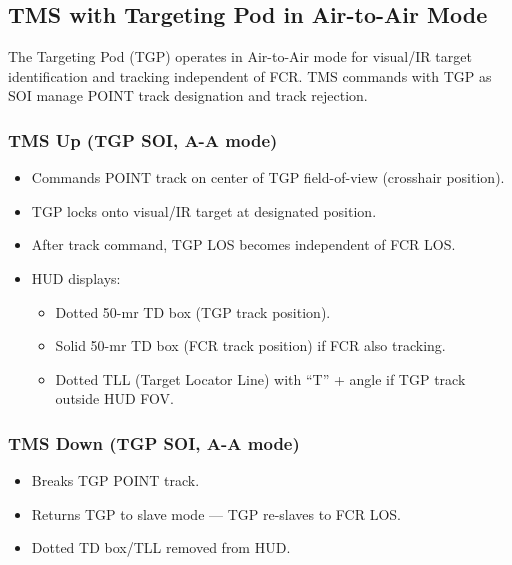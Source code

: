 \documentclass[11pt, a4paper, twoside]{report}
\begin{document}
\subsection{TMS with Targeting Pod in Air-to-Air Mode}
\label{sec:C4-S3-S6}

The Targeting Pod (TGP) operates in Air-to-Air mode for visual/IR target 
identification and tracking independent of FCR. TMS commands with TGP as 
SOI manage POINT track designation and track rejection.

\subsubsection*{TMS Up (TGP SOI, A-A mode)}
\label{sec:C4-S3-S6-S1}

\begin{itemize}[nosep]
    \item Commands POINT track on center of TGP field-of-view (crosshair position).
    \item TGP locks onto visual/IR target at designated position.
    \item After track command, TGP LOS becomes independent of FCR LOS.
    \item HUD displays:
    \begin{itemize}[nosep]
        \item Dotted 50-mr TD box (TGP track position).
        \item Solid 50-mr TD box (FCR track position) if FCR also tracking.
        \item Dotted TLL (Target Locator Line) with ``T'' + angle if TGP track outside HUD FOV.
    \end{itemize}
\end{itemize}

\subsubsection*{TMS Down (TGP SOI, A-A mode)}
\label{sec:C4-S3-S6-S2}

\begin{itemize}[nosep]
    \item Breaks TGP POINT track.
    \item Returns TGP to slave mode --- TGP re-slaves to FCR LOS.
    \item Dotted TD box/TLL removed from HUD.
\end{itemize}
\end{document}
